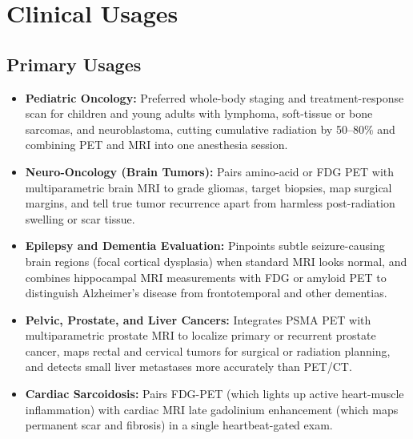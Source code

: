 \section{Clinical Usages}

\subsection{Primary Usages}
\begin{itemize}
\item \textbf{Pediatric Oncology:} Preferred whole-body staging and treatment-response scan for children and young adults with lymphoma, soft-tissue or bone sarcomas, and neuroblastoma, cutting cumulative radiation by 50--80\% and combining PET and MRI into one anesthesia session.
\item \textbf{Neuro-Oncology (Brain Tumors):} Pairs amino-acid or FDG PET with multiparametric brain MRI to grade gliomas, target biopsies, map surgical margins, and tell true tumor recurrence apart from harmless post-radiation swelling or scar tissue.
\item \textbf{Epilepsy and Dementia Evaluation:} Pinpoints subtle seizure-causing brain regions (focal cortical dysplasia) when standard MRI looks normal, and combines hippocampal MRI measurements with FDG or amyloid PET to distinguish Alzheimer's disease from frontotemporal and other dementias.
\item \textbf{Pelvic, Prostate, and Liver Cancers:} Integrates PSMA PET with multiparametric prostate MRI to localize primary or recurrent prostate cancer, maps rectal and cervical tumors for surgical or radiation planning, and detects small liver metastases more accurately than PET/CT.
\item \textbf{Cardiac Sarcoidosis:} Pairs FDG-PET (which lights up active heart-muscle inflammation) with cardiac MRI late gadolinium enhancement (which maps permanent scar and fibrosis) in a single heartbeat-gated exam.
\end{itemize}

